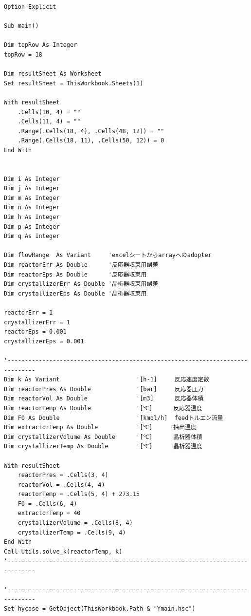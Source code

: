 \documentclass[a4j]{jsreport}
\begin{document}
\begin{lstlisting}[caption=HYSYSとpythonを繋ぐコード]
Option Explicit

Sub main()

Dim topRow As Integer
topRow = 18

Dim resultSheet As Worksheet
Set resultSheet = ThisWorkbook.Sheets(1)

With resultSheet
    .Cells(10, 4) = ""
    .Cells(11, 4) = ""
    .Range(.Cells(18, 4), .Cells(48, 12)) = ""
    .Range(.Cells(18, 11), .Cells(50, 12)) = 0
End With


Dim i As Integer
Dim j As Integer
Dim m As Integer
Dim n As Integer
Dim h As Integer
Dim p As Integer
Dim q As Integer

Dim flowRange  As Variant     'excelシートからarrayへのadopter
Dim reactorErr As Double      '反応器収束用誤差
Dim reactorEps As Double      '反応器収束用
Dim crystallizerErr As Double '晶析器収束用誤差
Dim crystallizerEps As Double '晶析器収束用

reactorErr = 1
crystallizerErr = 1
reactorEps = 0.001
crystallizerEps = 0.001

'------------------------------------------------------------------------------
Dim k As Variant                      '[h-1]     反応速度定数
Dim reactorPres As Double             '[bar]     反応器圧力
Dim reactorVol As Double              '[m3]      反応器体積
Dim reactorTemp As Double             '[℃]      反応器温度
Dim F0 As Double                      '[kmol/h]  feedトルエン流量
Dim extractorTemp As Double           '[℃]      抽出温度
Dim crystallizerVolume As Double      '[℃]      晶析器体積
Dim crystallizerTemp As Double        '[℃]      晶析器温度

With resultSheet
    reactorPres = .Cells(3, 4)
    reactorVol = .Cells(4, 4)
    reactorTemp = .Cells(5, 4) + 273.15
    F0 = .Cells(6, 4)
    extractorTemp = 40
    crystallizerVolume = .Cells(8, 4)
    crystallizerTemp = .Cells(9, 4)
End With
Call Utils.solve_k(reactorTemp, k)
'------------------------------------------------------------------------------

'------------------------------------------------------------------------------
Set hycase = GetObject(ThisWorkbook.Path & "¥main.hsc")


\end{lstlisting}
\end{document}

